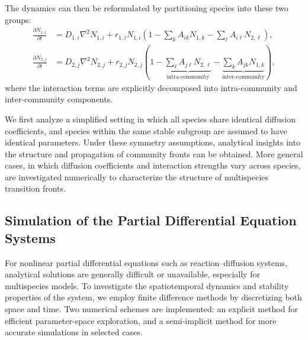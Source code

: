         The dynamics can then be reformulated by partitioning species into these two groups:
        \begin{equation*}
            \begin{aligned}
                \frac{\partial N_{1,i}}{\partial t}
                & = D_{1,i} \nabla^2 N_{1,i} 
                + r_{1,i} N_{1,i} 
                \left( 
                    1 
                    - \sum_{k} A_{ik} N_{1,k} 
                    - \sum_{\ell} A_{i\ell} N_{2,\ell} 
                \right),\\
                \frac{\partial N_{2,j}}{\partial t}
                &= D_{2,j}\nabla^2 N_{2,j} 
                + r_{2,j} N_{2,j} 
                \left( 
                    1 
                    - \underbrace{\sum_{\ell} A_{j\ell} N_{2,\ell}}_{\text{intra-community}} 
                    - \underbrace{\sum_{k} A_{jk} N_{1,k}}_{\text{inter-community}} 
                \right),
            \end{aligned}
        \end{equation*}
        where the interaction terms are explicitly decomposed into intra-community and inter-community components.

        We first analyze a simplified setting in which all species share identical diffusion coefficients, and species within the same stable subgroup are assumed to have identical parameters. Under these symmetry assumptions, analytical insights into the structure and propagation of community fronts can be obtained. More general cases, in which diffusion coefficients and interaction strengths vary across species, are investigated numerically to characterize the structure of multispecies transition fronts.

    \subsection{Simulation of the Partial Differential Equation Systems}

    For nonlinear partial differential equations such as reaction--diffusion systems, analytical solutions are generally difficult or unavailable, especially for multispecies models. To investigate the spatiotemporal dynamics and stability properties of the system, we employ finite difference methods by discretizing both space and time. Two numerical schemes are implemented: an explicit method for efficient parameter-space exploration, and a semi-implicit method for more accurate simulations in selected cases.

